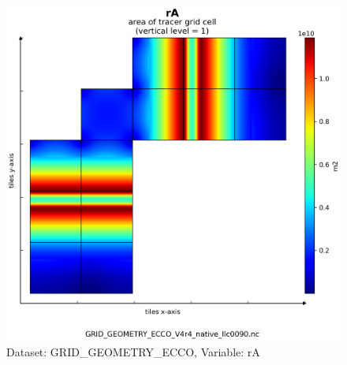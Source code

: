 \begin{figure}[H]
\centering
\includegraphics[scale=0.55]{../images/plots/v4r4/native_plots_coords/Geometry_Parameters_for_the_Lat-Lon-Cap_90_(llc90)_Native_Model_Grid_(Version_4_Release_4)/rA.png}
\caption{Dataset: GRID\_GEOMETRY\_ECCO, Variable: rA}
\label{tab:table-GRID_GEOMETRY_ECCO_rA-Plot}
\end{figure}
\newpage
\pagebreak
